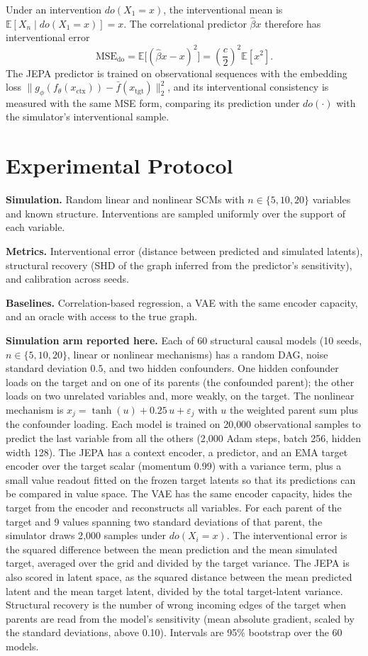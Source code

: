 \documentclass[conference]{IEEEtran}
\begin{document}
Under an intervention $do(X_1=x)$, the interventional mean is $\mathbb{E}[X_n\mid do(X_1=x)]=x$. The correlational predictor $\hat\beta x$ therefore has interventional error
\begin{equation}
\mathrm{MSE}_{\mathrm{do}}=\mathbb{E}\big[(\hat\beta x-x)^2\big]=\left(\frac{c}{2}\right)^2\mathbb{E}[x^2].
\end{equation}
The JEPA predictor is trained on observational sequences with the embedding loss $\lVert g_\phi(f_\theta(x_{\mathrm{ctx}}))-\bar f(x_{\mathrm{tgt}})\rVert_2^2$, and its interventional consistency is measured with the same MSE form, comparing its prediction under $do(\cdot)$ with the simulator's interventional sample.

\section{Experimental Protocol}
\textbf{Simulation.} Random linear and nonlinear SCMs with $n \in \{5, 10, 20\}$ variables and known structure. Interventions are sampled uniformly over the support of each variable.

\textbf{Metrics.} Interventional error (distance between predicted and simulated latents), structural recovery (SHD of the graph inferred from the predictor's sensitivity), and calibration across seeds.

\textbf{Baselines.} Correlation-based regression, a VAE with the same encoder capacity, and an oracle with access to the true graph.

\textbf{Simulation arm reported here.} Each of 60 structural causal models (10 seeds, $n\in\{5,10,20\}$, linear or nonlinear mechanisms) has a random DAG, noise standard deviation $0.5$, and two hidden confounders. One hidden confounder loads on the target and on one of its parents (the confounded parent); the other loads on two unrelated variables and, more weakly, on the target. The nonlinear mechanism is $x_j=\tanh(u)+0.25\,u+\varepsilon_j$ with $u$ the weighted parent sum plus the confounder loading. Each model is trained on 20{,}000 observational samples to predict the last variable from all the others (2{,}000 Adam steps, batch 256, hidden width 128). The JEPA has a context encoder, a predictor, and an EMA target encoder over the target scalar (momentum 0.99) with a variance term, plus a small value readout fitted on the frozen target latents so that its predictions can be compared in value space. The VAE has the same encoder capacity, hides the target from the encoder and reconstructs all variables. For each parent of the target and 9 values spanning two standard deviations of that parent, the simulator draws 2{,}000 samples under $do(X_i=x)$. The interventional error is the squared difference between the mean prediction and the mean simulated target, averaged over the grid and divided by the target variance. The JEPA is also scored in latent space, as the squared distance between the mean predicted latent and the mean target latent, divided by the total target-latent variance. Structural recovery is the number of wrong incoming edges of the target when parents are read from the model's sensitivity (mean absolute gradient, scaled by the standard deviations, above 0.10). Intervals are 95\% bootstrap over the 60 models.
\end{document}
